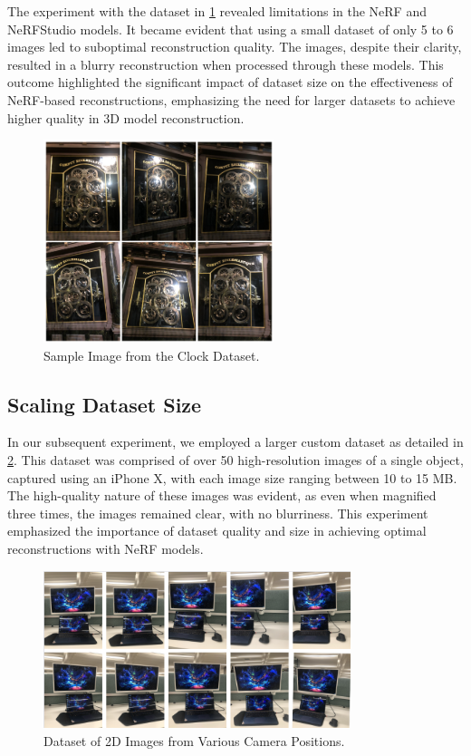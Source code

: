 The experiment with the dataset in \ref{fig:Clock Dataset} revealed limitations in the NeRF and NeRFStudio models. It became evident that using a small dataset of only 5 to 6 images led to suboptimal reconstruction quality. The images, despite their clarity, resulted in a blurry reconstruction when processed through these models. This outcome highlighted the significant impact of dataset size on the effectiveness of NeRF-based reconstructions, emphasizing the need for larger datasets to achieve higher quality in 3D model reconstruction.

\begin{figure}[H]
    \centering
    \includegraphics[width=0.6\textwidth]{img/Clock dataset.png}
    \caption{Sample Image from the Clock Dataset.}\label{fig:Clock Dataset}
\end{figure}




\subsection{Scaling Dataset Size}


In our subsequent experiment, we employed a larger custom dataset as detailed in \ref{fig:Dataset of 2D Images from Various Camera Positions}. This dataset was comprised of over 50 high-resolution images of a single object, captured using an iPhone X, with each image size ranging between 10 to 15 MB. The high-quality nature of these images was evident, as even when magnified three times, the images remained clear, with no blurriness. This experiment emphasized the importance of dataset quality and size in achieving optimal reconstructions with NeRF models.

\begin{figure}[thbp]
    \centering
    \includegraphics[width=0.8\textwidth]{img/Nerf data.png}
    \caption{Dataset of 2D Images from Various Camera Positions.}\label{fig:Dataset of 2D Images from Various Camera Positions}
\end{figure}

